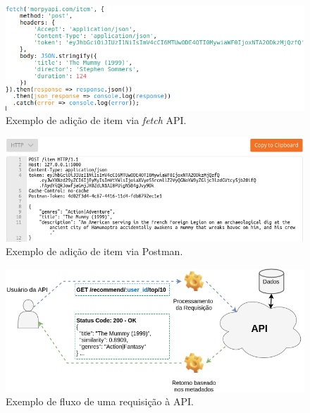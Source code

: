 \documentclass[12pt, openright, oneside, a4paper, brazil]{abntex2}
\begin{document}
\begin{figure}[htp]
	\caption{\label{fetch_api}Exemplo de adição de item via \textit{fetch} API.}
	\begin{center}
		\includegraphics[scale=0.8]{images/fetch_api.png}
	\end{center}
	\hspace{5.5cm}{Fonte: O Autor.}
\end{figure}

\begin{figure}[htp]
	\caption{\label{postman}Exemplo de adição de item via Postman.}
	\begin{center}
		\includegraphics[scale=0.85]{images/postman.png}
	\end{center}
	\hspace{5.5cm}{Fonte: O Autor.}
\end{figure}

\begin{figure}[htp]
	\caption{\label{interconnection}Exemplo de fluxo de uma requisição à API.}
	\begin{center}
		\includegraphics[scale=0.62]{images/interconnection.png}
	\end{center}
	\hspace{5.5cm}{Fonte: O Autor.}
\end{figure}
\end{document}
